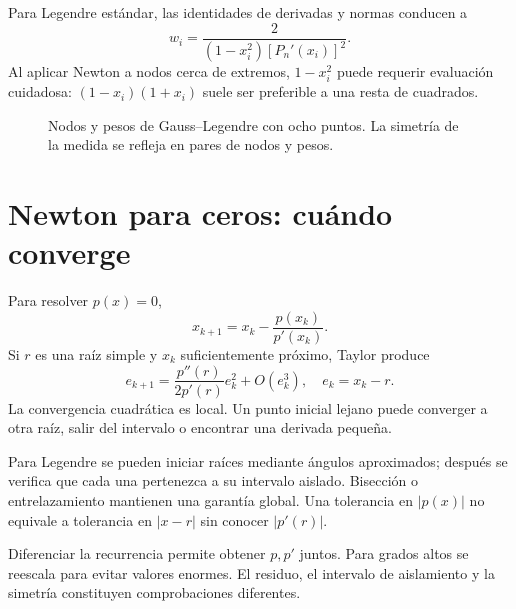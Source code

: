 \documentclass[11pt,a4paper]{article}
\theoremstyle{definition}
\begin{document}
Para Legendre estándar, las identidades de derivadas y normas conducen a
\[
w_i=\frac2{(1-x_i^2)[P_n'(x_i)]^2}.
\]
Al aplicar Newton a nodos cerca de extremos, $1-x_i^2$ puede requerir evaluación cuidadosa: $(1-x_i)(1+x_i)$ suele ser preferible a una resta de cuadrados.






\begin{figure}[htbp]\centering
{}
\caption{Nodos y pesos de Gauss--Legendre con ocho puntos. La simetría de la medida se refleja en pares de nodos y pesos.}\label{fig:cdf-9}\end{figure}

\section{Newton para ceros: cuándo converge}
Para resolver $p(x)=0$,
\[
x_{k+1}=x_k-\frac{p(x_k)}{p'(x_k)}.
\]
Si $r$ es una raíz simple y $x_k$ suficientemente próximo, Taylor produce
\[
e_{k+1}=\frac{p''(r)}{2p'(r)}e_k^2+O(e_k^3),
\quad e_k=x_k-r.
\]
La convergencia cuadrática es local. Un punto inicial lejano puede converger a otra raíz, salir del intervalo o encontrar una derivada pequeña.

Para Legendre se pueden iniciar raíces mediante ángulos aproximados; después se verifica que cada una pertenezca a su intervalo aislado. Bisección o entrelazamiento mantienen una garantía global. Una tolerancia en $|p(x)|$ no equivale a tolerancia en $|x-r|$ sin conocer $|p'(r)|$.

Diferenciar la recurrencia permite obtener $p,p'$ juntos. Para grados altos se reescala para evitar valores enormes. El residuo, el intervalo de aislamiento y la simetría constituyen comprobaciones diferentes.
\end{document}
